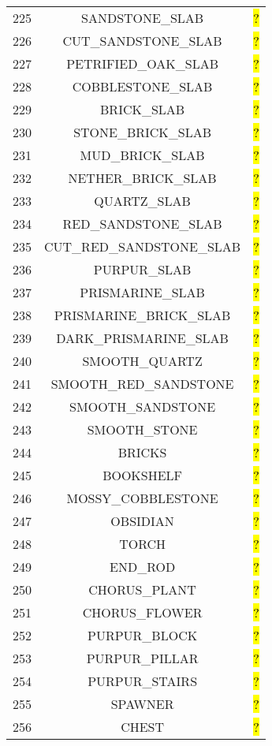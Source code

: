\documentclass[11pt]{article}
\newcommand\myworries[1]{\sethlcolor{red}\hl{#1}}
\begin{document}
\begin{longtable}{ |c|c|c| }
	225 & SANDSTONE\_SLAB & \myworries{?} \\
	226 & CUT\_SANDSTONE\_SLAB & \myworries{?} \\
	227 & PETRIFIED\_OAK\_SLAB & \myworries{?} \\
	228 & COBBLESTONE\_SLAB & \myworries{?} \\
	229 & BRICK\_SLAB & \myworries{?} \\
	230 & STONE\_BRICK\_SLAB & \myworries{?} \\
	231 & MUD\_BRICK\_SLAB & \myworries{?} \\
	232 & NETHER\_BRICK\_SLAB & \myworries{?} \\
	233 & QUARTZ\_SLAB & \myworries{?} \\
	234 & RED\_SANDSTONE\_SLAB & \myworries{?} \\
	235 & CUT\_RED\_SANDSTONE\_SLAB & \myworries{?} \\
	236 & PURPUR\_SLAB & \myworries{?} \\
	237 & PRISMARINE\_SLAB & \myworries{?} \\
	238 & PRISMARINE\_BRICK\_SLAB & \myworries{?} \\
	239 & DARK\_PRISMARINE\_SLAB & \myworries{?} \\
	240 & SMOOTH\_QUARTZ & \myworries{?} \\
	241 & SMOOTH\_RED\_SANDSTONE & \myworries{?} \\
	242 & SMOOTH\_SANDSTONE & \myworries{?} \\
	243 & SMOOTH\_STONE & \myworries{?} \\
	244 & BRICKS & \myworries{?} \\
	245 & BOOKSHELF & \myworries{?} \\
	246 & MOSSY\_COBBLESTONE & \myworries{?} \\
	247 & OBSIDIAN & \myworries{?} \\
	248 & TORCH & \myworries{?} \\
	249 & END\_ROD & \myworries{?} \\
	250 & CHORUS\_PLANT & \myworries{?} \\
	251 & CHORUS\_FLOWER & \myworries{?} \\
	252 & PURPUR\_BLOCK & \myworries{?} \\
	253 & PURPUR\_PILLAR & \myworries{?} \\
	254 & PURPUR\_STAIRS & \myworries{?} \\
	255 & SPAWNER & \myworries{?} \\
	256 & CHEST & \myworries{?} \\

\end{longtable}
\end{document}
